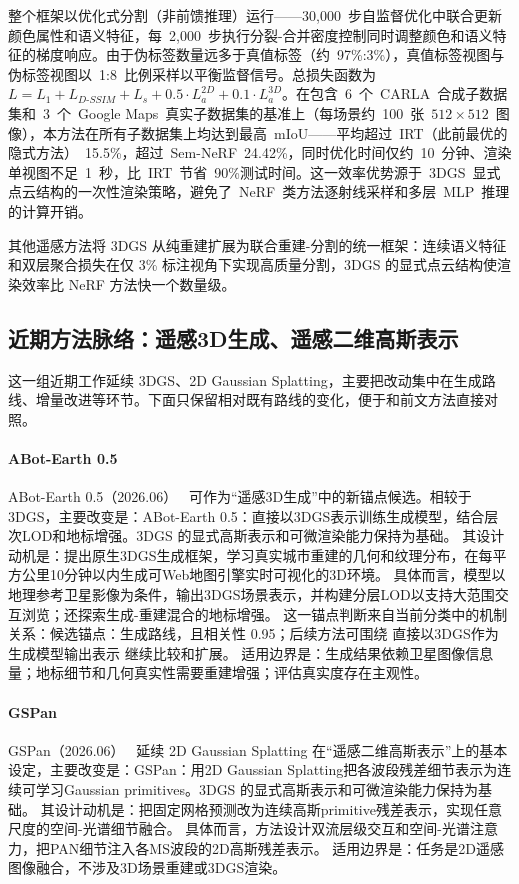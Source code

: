 整个框架以优化式分割（非前馈推理）运行——30,000~步自监督优化中联合更新颜色属性和语义特征，每~2,000~步执行分裂-合并密度控制同时调整颜色和语义特征的梯度响应。由于伪标签数量远多于真值标签（约~97\%:3\%），真值标签视图与伪标签视图以~1:8~比例采样以平衡监督信号。总损失函数为$L = L_1 + L_{D\text{-}SSIM} + L_s + 0.5 \cdot L_a^{2D} + 0.1 \cdot L_a^{3D}$。在包含~6~个~CARLA~合成子数据集和~3~个~Google Maps~真实子数据集的基准上（每场景约~100~张~$512 \times 512$~图像），本方法在所有子数据集上均达到最高~mIoU——平均超过~IRT（此前最优的隐式方法）~15.5\%，超过~Sem-NeRF~24.42\%，同时优化时间仅约~10~分钟、渲染单视图不足~1~秒，比~IRT~节省~90\%测试时间。这一效率优势源于~3DGS~显式点云结构的一次性渲染策略，避免了~NeRF~类方法逐射线采样和多层~MLP~推理的计算开销。

\begin{takeaway}
其他遥感方法将 3DGS 从纯重建扩展为联合重建-分割的统一框架：连续语义特征和双层聚合损失在仅 3\% 标注视角下实现高质量分割，3DGS 的显式点云结构使渲染效率比 NeRF 方法快一个数量级。
\end{takeaway}


\subsection{近期方法脉络：遥感3D生成、遥感二维高斯表示}

这一组近期工作延续 3DGS、2D Gaussian Splatting，主要把改动集中在生成路线、增量改进等环节。下面只保留相对既有路线的变化，便于和前文方法直接对照。

\paragraph{ABot-Earth 0.5}
ABot-Earth 0.5（2026.06）~\cite{2606_09967} 可作为“遥感3D生成”中的新锚点候选。相较于 3DGS，主要改变是：ABot-Earth 0.5：直接以3DGS表示训练生成模型，结合层次LOD和地标增强。3DGS 的显式高斯表示和可微渲染能力保持为基础。
其设计动机是：提出原生3DGS生成框架，学习真实城市重建的几何和纹理分布，在每平方公里10分钟以内生成可Web地图引擎实时可视化的3D环境。
具体而言，模型以地理参考卫星影像为条件，输出3DGS场景表示，并构建分层LOD以支持大范围交互浏览；还探索生成-重建混合的地标增强。
这一锚点判断来自当前分类中的机制关系：候选锚点：生成路线，且相关性 0.95；后续方法可围绕 直接以3DGS作为生成模型输出表示 继续比较和扩展。
适用边界是：生成结果依赖卫星图像信息量；地标细节和几何真实性需要重建增强；评估真实度存在主观性。

\paragraph{GSPan}
GSPan（2026.06）~\cite{2606_17722} 延续 2D Gaussian Splatting 在“遥感二维高斯表示”上的基本设定，主要改变是：GSPan：用2D Gaussian Splatting把各波段残差细节表示为连续可学习Gaussian primitives。3DGS 的显式高斯表示和可微渲染能力保持为基础。
其设计动机是：把固定网格预测改为连续高斯primitive残差表示，实现任意尺度的空间-光谱细节融合。
具体而言，方法设计双流层级交互和空间-光谱注意力，把PAN细节注入各MS波段的2D高斯残差表示。
适用边界是：任务是2D遥感图像融合，不涉及3D场景重建或3DGS渲染。

